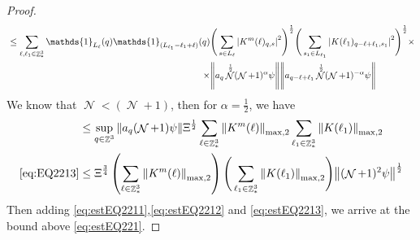 \documentclass[sn-mathphys, Numbered ,a4paper]{sn-jnl}%
\DeclareMathOperator{\Z}{\mathbb{Z}}
\DeclareMathOperator{\NN}{\mathcal{N}}
\newcommand{\half}{\frac{1}{2}}
\theoremstyle{plain}
\theoremstyle{definition}
\theoremstyle{remark}
\theoremstyle{plain}
\theoremstyle{definition}
\theoremstyle{remark}
\begin{document}
\begin{proof}
\begin{alignat}{2}
	&\leq\sum\limits_{\ell, \ell_1\in \Z^3_*} \mathds{1}_{L_{\ell}}(q) \begin{aligned}[t] \mathds{1}_{(L_{\ell_1}-\ell_1+\ell)}(q) &\Bigg(\sum\limits_{s \in L_{\ell}} \abs{K^m(\ell)_{q,s}}^2\Bigg)^\half \Bigg(\sum\limits_{s_1 \in L_{\ell_1}} \abs{K(\ell_1)_{q-\ell+\ell_1,s_1}}^2\Bigg)^\half \times\nonumber\\ \times&\norm{ a_{q} \NN^\half (\NN+1)^{\alpha}\psi} \norm{ a_{q-\ell+\ell_1} \NN^\half (\NN+1)^{-\alpha} \psi }\end{aligned}\\
\end{alignat}
We know that $\NN<(\NN+1)$, then for $\alpha = \half$, we have
\begin{align}
	&\leq \sup_{q \in \Z^3}\norm{ a_{q} (\NN+1)\psi} \Xi^\half\sum\limits_{\ell \in \Z^3_*} \norm{  K^{m}(\ell)}_{\mathrm{max,2}}  \sum\limits_{\ell_1 \in \Z^3_*} \norm{K(\ell_1)}_{\mathrm{max,2}} \nonumber\\
	\eqref{eq:EQ2213}&\leq \Xi^{\frac{3}{4}} \left(\sum\limits_{\ell \in \Z^3_*} \norm{K^m(\ell)}_{\mathrm{max,2}}\right) \Bigg(\sum\limits_{\ell_1 \in \Z^3_*} \norm{K(\ell_1)}_{\mathrm{max,2}} \Bigg)  \norm{ (\NN+1)^2\psi}^\half \label{eq:estEQ2213}
\end{align}
 Then adding \eqref{eq:estEQ2211},\eqref{eq:estEQ2212} and \eqref{eq:estEQ2213}, we arrive at the bound above \eqref{eq:estEQ221}. 
\end{proof}
\end{document}

